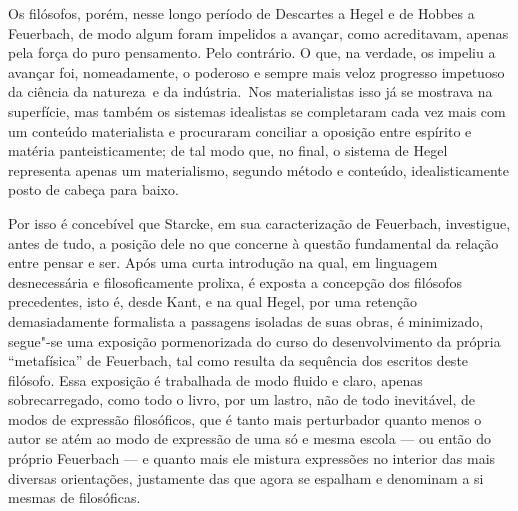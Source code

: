 Os filósofos, porém, nesse longo período
de Descartes a Hegel e de Hobbes a Feuerbach,
de modo algum foram impelidos a avançar, como acreditavam, apenas pela
força do puro pensamento. Pelo contrário. O que, na verdade, os impeliu
a avançar foi, nomeadamente, o poderoso e sempre mais veloz
progresso impetuoso da ciência da natureza \textbar{}\,e da indústria.\,\textbar{} Nos materialistas
isso já se mostrava na superfície, mas também os sistemas idealistas se
completaram cada vez mais com um conteúdo materialista e procuraram
conciliar a oposição entre espírito e matéria panteisticamente; de tal
modo que, no final, o sistema de Hegel representa apenas um materialismo, segundo método e conteúdo, idealisticamente posto de cabeça para baixo. 

Por isso é concebível que Starcke, em sua caracterização
de Feuerbach,
investigue, antes de tudo, a posição dele no que concerne à questão
fundamental da relação entre pensar e ser. Após uma curta
introdução na qual, em linguagem desnecessária e filosoficamente
prolixa, é exposta a concepção dos filósofos precedentes, isto é,
desde Kant, %
e na qual
Hegel,
por uma retenção demasiadamente formalista a passagens isoladas de suas
obras, é minimizado, segue"-se uma exposição pormenorizada do curso do
desenvolvimento da própria ``metafísica''
de Feuerbach,
tal como resulta da sequência dos escritos deste filósofo.
Essa exposição é trabalhada de modo fluido e claro, apenas
sobrecarregado, como todo o livro, por um lastro, não de
todo inevitável, de modos de expressão filosóficos, que é tanto mais
perturbador quanto menos o autor se atém ao modo de expressão de uma só
e mesma escola --- ou então do
próprio Feuerbach ---
e quanto mais ele mistura expressões no interior das mais diversas
orientações, justamente das que agora se espalham e denominam a si
mesmas de filosóficas.

